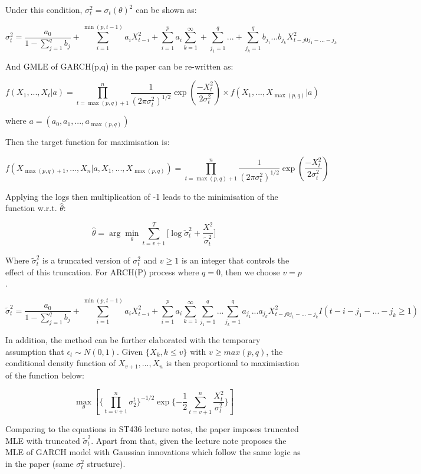 \documentclass[
  11pt,
]{article}
\begin{document}
Under this condition, \(\sigma_t^2= \sigma_t(\theta)^2\) can be shown
as:

\[\sigma_t^2=\frac{a_0}{1-\sum^{q}_{j=1}b_{j}}+\sum^{\min(p, t-1)}_{i=1}a_{i}X^2_{t-i}+\sum^{p}_{i=1}a_{i}\sum^{\infty}_{k=1}+\sum^{q}_{j_1=1}...+\sum^{q}_{j_k=1}b_{j_1}...b_{j_k}X^2_{t-j0j_1-...-j_k}\]

And GMLE of GARCH(p,q) in the paper can be re-written as:

\[f(X_1,...,X_t|a)=\prod_{t=\max(p,q)+1}^n \frac{1}{(2\pi\sigma_t^2)^{1/2}}\exp(\frac{-X_t^2}{2\sigma_t^2})\times f(X_1,...,X_{\max(p,q)}|a)\]

where \(a=(a_0,a_1,...,a_{\max(p,q)})\)

Then the target function for maximisation is:

\[f(X_{\max(p,q)+1},...,X_n|a,X_1,...,X_{\max(p,q)}) =\prod_{t=\max(p,q)+1}^n \frac{1}{(2\pi\sigma_t^2)^{1/2}}\exp(\frac{-X_t^2}{2\sigma_t^2})\]

Applying the logs then multiplication of -1 leads to the minimisation of
the function w.r.t. \(\hat\theta\):

\[\hat{\theta}=\arg\min_{\theta}\sum^{T}_{t=v+1}\lbrack\log\tilde\sigma_{t}^2+\frac{X^2}{\tilde\sigma_{t}^2}\rbrack\]

Where \(\tilde\sigma_t^2\) is a truncated version of \(\sigma_t^2\) and
\(v \ge1\) is an integer that controls the effect of this truncation.
For ARCH(P) process where \(q =0\), then we choose \(v=p\) .

\[\tilde\sigma_t^2=\frac{a_0}{1-\sum^{q}_{j=1}b_{j}}+\sum^{\min(p, t-1)}_{i=1}a_{i}X^2_{t-i}+\sum^{p}_{i=1}a_{i}\sum^{\infty}_{k=1}\sum^{q}_{j_1=1}...\sum^{q}_{j_k=1}a_{j_1}...a_{j_k}X^2_{t-j0j_1-...-j_k}I(t-i-j_1-...-j_k\ge1)\]

In addition, the method can be further elaborated with the temporary
assumption that \(\epsilon_t\sim N(0,1)\). Given \(\{X_k,k\le v\}\) with
\(v \ge max(p,q)\), the conditional density function of
\(X_{v+1},...,X_n\) is then proportional to maximisation of the function
below:

\[\max_{\theta}[\lbrace\prod^n_{t=v+1}\sigma^t_2\rbrace^{-1/2}\exp\lbrace-\frac{1}{2}\sum^n_{t=v+1}\frac{X^2_t}{\sigma_t^2}\rbrace]\]

Comparing to the equations in ST436 lecture notes, the paper imposes
truncated MLE with truncated \(\tilde\sigma^2_t\). Apart from that,
given the lecture note proposes the MLE of GARCH model with Gaussian
innovations which follow the same logic as in the paper (same
\(\sigma_t^2\) structure).
\end{document}
